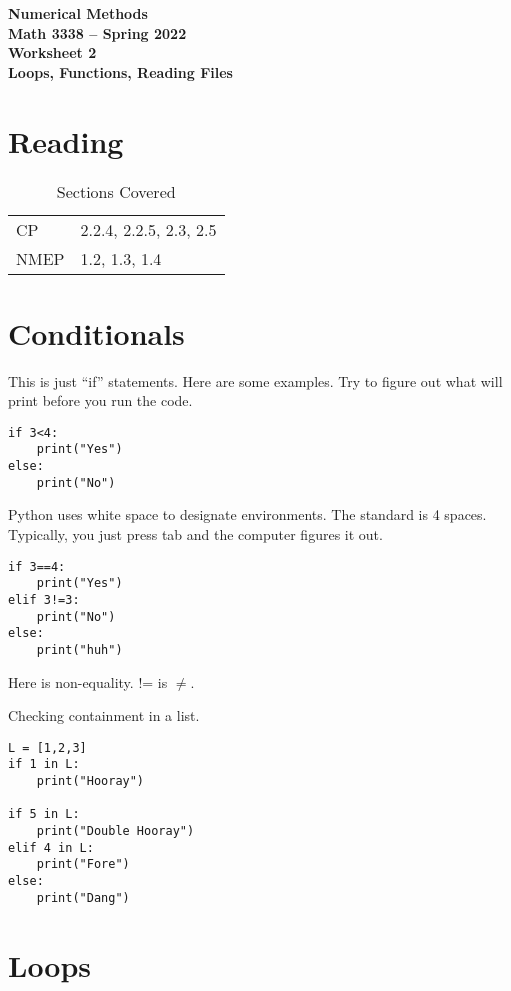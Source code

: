 \documentclass[11pt,letterpaper]{article}
\newcommand{\semester}{Spring 2022}
\begin{document}
\begin{center}
{\huge{\bf  Numerical Methods}} \\[1.5ex]
{\bf Math 3338 -- \semester}\\[1.5ex]
{\Large{\bf Worksheet 2\ \\[2ex] Loops, Functions, Reading Files}}\\
\end{center}
\vspace{2mm}

\section{Reading}

\begin{table}[!ht]
 \centering
 \begin{tabular}{ll}
   CP & 2.2.4, 2.2.5, 2.3, 2.5 \\
 NMEP &  1.2, 1.3, 1.4
 \end{tabular}
\caption{Sections Covered}
\end{table}








\section{Conditionals}
This is just ``if'' statements. Here are some examples. Try to figure out what will print before you
run the code.

\begin{verbatim}
if 3<4:
    print("Yes")
else:
    print("No")
\end{verbatim}
Python uses white space to designate environments. The standard is 4 spaces. Typically, you just press
tab and the computer figures it out.

\begin{verbatim}
if 3==4:
    print("Yes")
elif 3!=3:
    print("No")
else:
    print("huh")
\end{verbatim}
Here is non-equality. != is $\neq$.

Checking containment in a list.
\begin{verbatim}
L = [1,2,3]
if 1 in L:
    print("Hooray")

if 5 in L:
    print("Double Hooray")
elif 4 in L:
    print("Fore")
else:
    print("Dang")
\end{verbatim}

\section{Loops}
\end{document}
